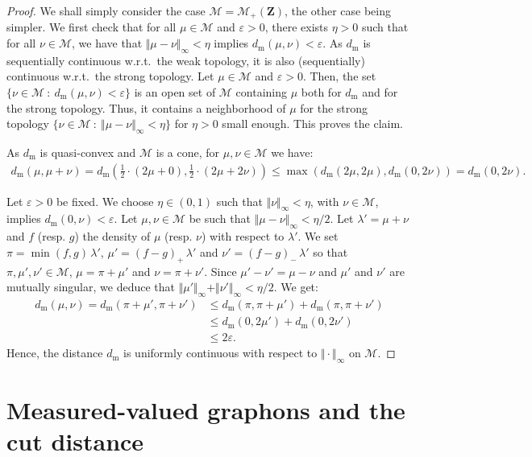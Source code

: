 \documentclass{amsart}
\newcommand{\wrt}{w.r.t.\ }
\theoremstyle{plain}
\theoremstyle{definition}
\newcommand{\Space}{\mathbf{Z}}
\newcommand{\cm}{\mathcal{M}}
\newcommand{\cM}{\mathcal{M}}
\newcommand{\TM}[1]{\norm{#1}_\infty}
\newcommand{\m}{\mathrm{m}}
\newcommand{\dmeas}{d_\m}
\newcommand{\norm}[1]{\Vert#1\Vert}
\newcommand{\eps}{\varepsilon}
\begin{document}
\begin{proof}
  We  shall simply consider the case   $\cm=\cm_{+}(\Space)$, the
  other case being simpler. We  first check
  that for  all $\mu\in\cM$ and $\eps  > 0$, there exists  $\eta>0$ such
  that for all  $\nu\in\cM$, we have that $\TM{\mu-\nu}  < \eta$ implies
  $\dmeas(\mu,\nu)<\eps$.   As   $\dmeas$   is   sequentially
  continuous  \wrt   the  weak  topology,  it   is  also  (sequentially)
  continuous \wrt  the strong  topology.  Let $\mu\in\cM$  and $\eps>0$.
  Then, the set $\{ \nu \in \cM \ : \  \dmeas(\mu,\nu) < \eps \}$ is an open set
  of  $\cM$  containing $\mu$  both  for  $\dmeas$  and for  the  strong
  topology.  Thus,  it contains a  neighborhood of $\mu$ for  the strong
  topology  $\{ \nu \in  \cM \ : \ \TM{\mu-\nu}  < \eta \}$ for 
   $\eta>0$ small enough. This proves the claim. 


As $\dmeas$ is quasi-convex and $\cM$ is a cone, for $\mu,\nu \in \cM$ we have:
\begin{align*}
\dmeas(\mu,\mu+\nu)
= \dmeas\left( \frac{1}{2} \cdot (2 \mu + 0), \frac{1}{2} \cdot (2\mu + 2 \nu) \right)
\leq \max( \dmeas(2\mu, 2\mu), \dmeas(0, 2\nu))
= \dmeas(0, 2\nu) .
\end{align*}

Let $\eps>0$ be  fixed. We choose $\eta\in (0,1)$ such that  $\TM{\nu} < \eta$,
with $\nu\in\cM$,  implies $\dmeas(0,\nu)<\eps$.  Let $\mu,  \nu\in \cM$
be  such  that  $\TM{\mu  -  \nu}  <  \eta  /2$.
Let $\lambda'=\mu+\nu$ and $f$ (resp. $g$) the density of $\mu$
(resp. $\nu$) with respect to $\lambda'$. We set $\pi= \min(f,g) \,
\lambda'$, $\mu'=(f-g)_+ \, \lambda'$ and $\nu'=(f-g)_-\, \lambda'$ so
that $\pi,      \mu',       \nu'\in\cM$, $\mu   =  \pi   +  \mu'$ and
$\nu   =  \pi   +  \nu'$. Since
$\mu'-\nu'=\mu-\nu$ and $\mu'$ and $\nu'$ are mutually singular, we
deduce that  $\TM{\mu'} + \TM{\nu'} < \eta/2$. 
We get:
\begin{align*}
\dmeas(\mu,\nu) = \dmeas(\pi + \mu', \pi + \nu')
& \leq \dmeas(\pi, \pi+\mu') + \dmeas(\pi, \pi+\nu') \\
& \leq \dmeas(0, 2\mu') + \dmeas(0, 2\nu') \\
& \leq 2 \eps.
\end{align*}
Hence, the distance $\dmeas$ is uniformly continuous with respect to  $\TM{\cdot}$ on $\cM$.
\end{proof}





\section{Measured-valued graphons and the cut distance}\label{section_cut_distance}
\end{document}
